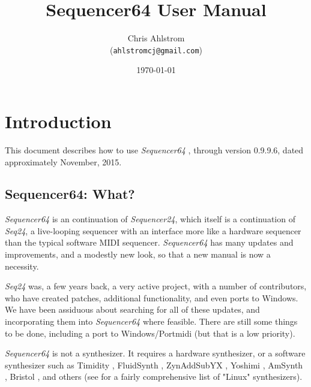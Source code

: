 \documentclass[
 11pt,
 twoside,
 a4paper,
 headinclude,
 footinclude,
 final                                 %
]{article}
\begin{document}
\title{Sequencer64 User Manual}
\author{Chris Ahlstrom \\
   (\texttt{ahlstromcj@gmail.com})}
\date{\today}
\maketitle
\tableofcontents
\listoffigures                         %
\listoftables                          %


\setlength{\parindent}{0pt}
\setlength{\parskip}{1ex plus 0.5ex minus 0.2ex}

\section{Introduction}
\label{sec:introduction}

   This document describes how to use \textsl{Sequencer64}
   \cite{sequencer64},
   through version 0.9.9.6, dated approximately November, 2015.

\subsection{Sequencer64: What?}
\label{subsec:what_is_sequencer64}

   \textsl{Sequencer64} is an continuation of \textsl{Sequencer24}, 
   which itself is a continuation of \textsl{Seq24},
   a live-looping sequencer with an interface more like a hardware sequencer
   than the typical software MIDI sequencer.
   \textsl{Sequencer64} has many updates and improvements, and a modestly
   new look, so that a new manual is now a necessity.

   \textsl{Seq24} was, a few years back, a very active project, with a
   number of contributors, who have created patches, additional
   functionality, and even ports to Windows.
   We have been assiduous about searching for all of these updates, and
   incorporating them into \textsl{Sequencer64} where feasible.
   There are still some things to be done, including a port to
   Windows/Portmidi (but that is a low priority).

   \textsl{Sequencer64} is not a synthesizer.  It requires a hardware
   synthesizer, or a software synthesizer such as Timidity \cite{timidity},
   FluidSynth \cite{fluidsynth}, ZynAddSubYX \cite{zynaddsubfx}, Yoshimi
   \cite{yoshimi} \cite{yoshimi2}, AmSynth \cite{amsynth}, Bristol
   \cite{bristol}, and others (see \cite{linuxsynths} for a fairly
   comprehensive list of "Linux" synthesizers).
\end{document}

